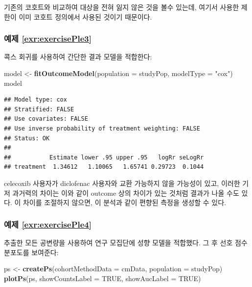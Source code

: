 \documentclass[10.5pt]{book}
\newenvironment{Shaded}{\begin{snugshade}}{\end{snugshade}}
\newcommand{\KeywordTok}[1]{\textcolor[rgb]{0.13,0.29,0.53}{\textbf{#1}}}
\newcommand{\DataTypeTok}[1]{\textcolor[rgb]{0.13,0.29,0.53}{#1}}
\newcommand{\StringTok}[1]{\textcolor[rgb]{0.31,0.60,0.02}{#1}}
\newcommand{\OtherTok}[1]{\textcolor[rgb]{0.56,0.35,0.01}{#1}}
\newcommand{\NormalTok}[1]{#1}
\theoremstyle{definition}
\theoremstyle{definition}
\theoremstyle{definition}
\theoremstyle{remark}
\begin{document}
기존의 코호트와 비교하여 대상을 전혀 잃지 않은 것을 볼수 있는데, 여기서
사용한 제한이 이미 코호트 정의에서 사용된 것이기 때문이다.

\subsubsection*{예제 \ref{exr:exercisePle3}}\label{-refexrexerciseple3}

콕스 회귀를 사용하여 간단한 결과 모델을 적합한다:

\begin{Shaded}
\begin{Highlighting}[]
\NormalTok{model <-}\StringTok{ }\KeywordTok{fitOutcomeModel}\NormalTok{(}\DataTypeTok{population =}\NormalTok{ studyPop,}
                         \DataTypeTok{modelType =} \StringTok{"cox"}\NormalTok{)}
\NormalTok{model}
\end{Highlighting}
\end{Shaded}

\begin{verbatim}
## Model type: cox
## Stratified: FALSE
## Use covariates: FALSE
## Use inverse probability of treatment weighting: FALSE
## Status: OK
## 
##           Estimate lower .95 upper .95   logRr seLogRr
## treatment  1.34612   1.10065   1.65741 0.29723  0.1044
\end{verbatim}

celecoxib 사용자가 diclofenac 사용자와 교환 가능하지 않을 가능성이 있고,
이러한 기저 과거력의 차이는 이와 같이 outcome 상의 차이가 있는 것처럼
결과가 나올 수도 있다. 이 차이를 조절하지 않으면, 이 분석과 같이 편향된
측정을 생성할 수 있다.

\subsubsection*{예제 \ref{exr:exercisePle4}}\label{-refexrexerciseple4}

추출한 모든 공변량을 사용하여 연구 모집단에 성향 모델을 적합했다. 그 후
선호 점수 분포도를 보여준다:

\begin{Shaded}
\begin{Highlighting}[]
\NormalTok{ps <-}\StringTok{ }\KeywordTok{createPs}\NormalTok{(}\DataTypeTok{cohortMethodData =}\NormalTok{ cmData,}
               \DataTypeTok{population =}\NormalTok{ studyPop)}
\KeywordTok{plotPs}\NormalTok{(ps, }\DataTypeTok{showCountsLabel =} \OtherTok{TRUE}\NormalTok{, }\DataTypeTok{showAucLabel =} \OtherTok{TRUE}\NormalTok{)}
\end{Highlighting}
\end{Shaded}
\end{document}
